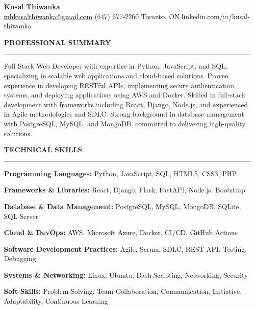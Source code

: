 \documentclass[10pt,letterpaper]{article}
\begin{document}
\begin{center}
{\LARGE\textbf{Kusal Thiwanka}}\\[3pt]
\href{mailto:mhkusalthiwanka@gmail.com}{mhkusalthiwanka@gmail.com}\hspace{2em}%
(647) 677{-}2260\hspace{2em}%
Toronto, ON\hspace{2em}
linkedin.com/in/kusal-thiwanka
\end{center}

\vspace{6pt}

\textbf{PROFESSIONAL SUMMARY}\\[-8pt]
\noindent\rule{\textwidth}{1pt}

\vspace{-2pt}

Full Stack Web Developer with expertise in Python, JavaScript, and SQL, specializing in scalable web applications and cloud-based solutions. Proven experience in developing RESTful APIs, implementing secure authentication systems, and deploying applications using AWS and Docker. Skilled in full-stack development with frameworks including React, Django, Node.js, and experienced in Agile methodologies and SDLC. Strong background in database management with PostgreSQL, MySQL, and MongoDB, committed to delivering high-quality solutions.

\vspace{8pt}

\textbf{TECHNICAL SKILLS}\\[-8pt]
\noindent\rule{\textwidth}{1pt}

\vspace{-2pt}

\textbf{Programming Languages:} Python, JavaScript, SQL, HTML5, CSS3, PHP

\textbf{Frameworks \& Libraries:} React, Django, Flask, FastAPI, Node.js, Bootstrap

\textbf{Database \& Data Management:} PostgreSQL, MySQL, MongoDB, SQLite, SQL Server

\textbf{Cloud \& DevOps:} AWS, Microsoft Azure, Docker, CI/CD, GitHub Actions

\textbf{Software Development Practices:} Agile, Scrum, SDLC, REST API, Testing, Debugging

\textbf{Systems \& Networking:} Linux, Ubuntu, Bash Scripting, Networking, Security

\textbf{Soft Skills:} Problem Solving, Team Collaboration, Communication, Initiative, Adaptability, Continuous Learning
\end{document}
